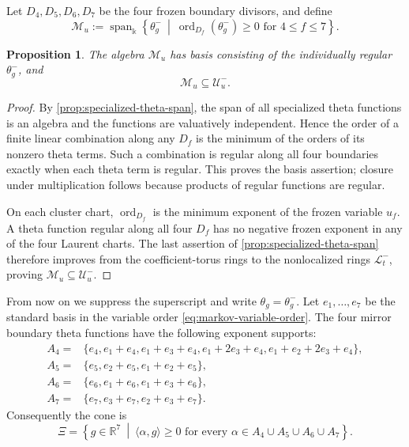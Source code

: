 \documentclass[11pt,reqno]{amsart}
\numberwithin{equation}{section}
\newtheorem{proposition}[proposition]{Proposition}
\theoremstyle{remark}
\newcommand{\kk}{\Bbbk}
\newcommand{\RR}{\mathbb{R}}
\newcommand{\cL}{\mathcal{L}}
\newcommand{\Uneg}{\mathcal U_u^{-}}
\newcommand{\Mu}{\mathcal M_u}
\newcommand{\ord}{\operatorname{ord}}
\begin{document}
Let $D_4,D_5,D_6,D_7$ be the four frozen boundary divisors, and define
\[ \Mu :=\operatorname{span}_{\kk}\left\{ \theta_g^-\ \middle|\ \ord_{D_f}(\theta_g^-)\ge0\text{ for }4\le f\le7 \right\}. \]

\begin{proposition}
\label{prop:negative-fiber-theta-algebra}
The algebra $\Mu$ has basis consisting of the individually regular
$\theta_g^-$, and
\[ \Mu\subseteq\Uneg. \]
\end{proposition}

\begin{proof}
By \cref{prop:specialized-theta-span}, the span of all specialized theta
functions is an algebra and the functions are valuatively independent.
Hence the order of a finite linear combination along any $D_f$ is the
minimum of the orders of its nonzero theta terms.  Such a combination is
regular along all four boundaries exactly when each theta term is regular.
This proves the basis assertion; closure under multiplication follows
because products of regular functions are regular.

On each cluster chart, $\ord_{D_f}$ is the minimum exponent of the frozen
variable $u_f$.  A theta function regular along all four $D_f$ has no
negative frozen exponent in any of the four Laurent charts.  The last
assertion of \cref{prop:specialized-theta-span} therefore improves from the
coefficient-torus rings to the nonlocalized rings $\cL_t^-$, proving
$\Mu\subseteq\Uneg$.
\end{proof}

From now on we suppress the superscript and write $\theta_g=\theta_g^-$.
Let $e_1,\ldots,e_7$ be the standard basis in the variable order
\eqref{eq:markov-variable-order}.  The four mirror boundary theta functions
have the following exponent supports:
\begin{equation*}
 \begin{aligned}
 A_4={}&\{e_4,e_1+e_4,e_1+e_3+e_4,
          e_1+2e_3+e_4,e_1+e_2+2e_3+e_4\},\\
 A_5={}&\{e_5,e_2+e_5,e_1+e_2+e_5\},\\
 A_6={}&\{e_6,e_1+e_6,e_1+e_3+e_6\},\\
 A_7={}&\{e_7,e_3+e_7,e_2+e_3+e_7\}.
 \end{aligned}
\end{equation*}
Consequently the cone is
\begin{equation}
\label{eq:explicit-cover-cone}
 \Xi=\left\{g\in\RR^7\ \middle|\
 \langle\alpha,g\rangle\ge0
 \text{ for every }\alpha\in A_4\cup A_5\cup A_6\cup A_7\right\}.
\end{equation}
\end{document}
